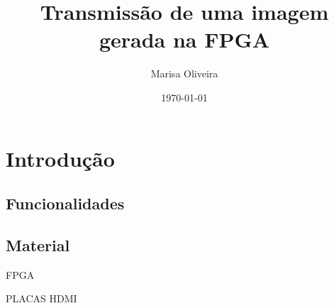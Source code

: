 \documentclass[a4paper]{article}
\title{Transmissão de uma imagem gerada na FPGA}
\author{Marisa Oliveira}
\date{\today}
\begin{document}
\maketitle


\section{Introdução}
\subsection{Funcionalidades}

\subsection{Material}
FPGA

PLACAS HDMI
\end{document}
